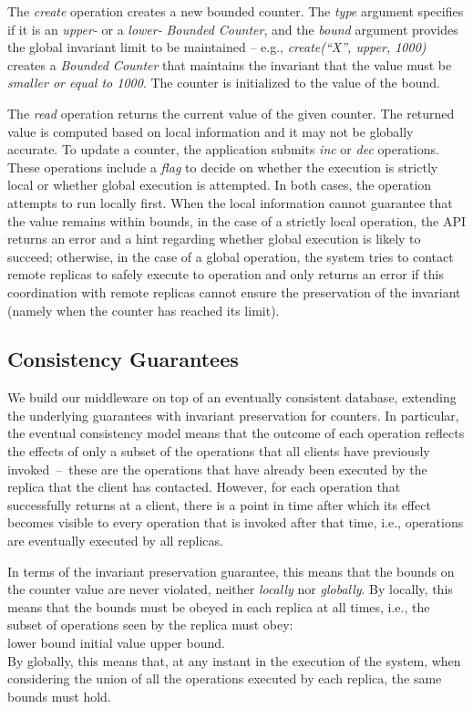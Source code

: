 \documentclass[conference]{IEEEtran}
\newcommand{\InvCounter}{\emph{Bounded Counter}}
\begin{document}
The \emph{create} operation creates a new bounded counter. 
The \emph{type} argument specifies if it is an \emph{upper-} or a \emph{lower-} \InvCounter{}, 
and the \emph{bound} argument provides the global invariant limit to be maintained -- e.g., 
\emph{create(``X'', upper, 1000)} creates a \InvCounter{} that maintains the invariant 
that the value must be \emph{smaller or equal to 1000}. 
The counter is initialized to the value of the bound.



The \emph{read} operation returns the current value of the given counter. 
The returned value is computed based on local information and it may not be globally accurate. 
To update a counter, the application submits \emph{inc} or \emph{dec} operations. 
These operations include a \emph{flag} to decide on whether the execution is strictly local or whether global execution is attempted.
In both cases, the operation attempts to run locally first. When the local information cannot guarantee that the value remains within bounds, in the case of a strictly local operation, the API returns an error and a hint regarding whether global execution is likely to succeed; otherwise, in the case of a global operation, the system tries to contact remote replicas to safely execute to operation and only returns an error if this coordination with remote replicas cannot ensure the preservation of the invariant (namely when the counter has reached its limit).



  


\subsection{Consistency Guarantees}

We build our middleware on top of an eventually consistent database, 
extending the underlying guarantees with invariant preservation for counters.
In particular, the eventual consistency model means that the outcome of each operation reflects
the effects of only a subset of the operations that all clients have previously invoked~--~these are the
operations that have already been executed by the replica that the client has contacted. However, for
each operation that successfully returns at a client, there is a point in time after which its effect
becomes visible to every operation that is invoked after that time, i.e., operations are eventually
executed by all replicas.

In terms of the invariant preservation guarantee, this means that the bounds on the counter
value are never violated, neither \emph{locally} nor \emph{globally}. 
By locally, this means that the bounds must
be obeyed in each replica at all times, i.e., the subset of operations seen by the replica must
obey:\\
\vspace{.2em} 
lower bound  initial value  upper bound.\\
\vspace{.2em} 
\noindent By globally, this means that, at any instant in the execution of the system, when
considering the union of all the operations executed by each replica, the same bounds must hold.
\end{document}
